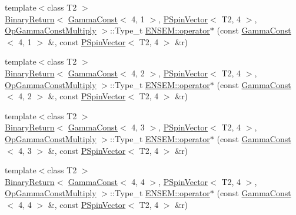 \begin{DoxyCompactItemize}
\item 
{\footnotesize template$<$class T2 $>$ }\\\mbox{\hyperlink{structENSEM_1_1BinaryReturn}{Binary\+Return}}$<$ \mbox{\hyperlink{classENSEM_1_1GammaConst}{Gamma\+Const}}$<$ 4, 1 $>$, \mbox{\hyperlink{classENSEM_1_1PSpinVector}{P\+Spin\+Vector}}$<$ T2, 4 $>$, \mbox{\hyperlink{structENSEM_1_1OpGammaConstMultiply}{Op\+Gamma\+Const\+Multiply}} $>$\+::Type\+\_\+t \mbox{\hyperlink{group__primspinvector_ga78fc0ed12245c6b5e7ab51e07bd4c553}{E\+N\+S\+E\+M\+::operator$\ast$}} (const \mbox{\hyperlink{classENSEM_1_1GammaConst}{Gamma\+Const}}$<$ 4, 1 $>$ \&, const \mbox{\hyperlink{classENSEM_1_1PSpinVector}{P\+Spin\+Vector}}$<$ T2, 4 $>$ \&r)
\item 
{\footnotesize template$<$class T2 $>$ }\\\mbox{\hyperlink{structENSEM_1_1BinaryReturn}{Binary\+Return}}$<$ \mbox{\hyperlink{classENSEM_1_1GammaConst}{Gamma\+Const}}$<$ 4, 2 $>$, \mbox{\hyperlink{classENSEM_1_1PSpinVector}{P\+Spin\+Vector}}$<$ T2, 4 $>$, \mbox{\hyperlink{structENSEM_1_1OpGammaConstMultiply}{Op\+Gamma\+Const\+Multiply}} $>$\+::Type\+\_\+t \mbox{\hyperlink{group__primspinvector_ga89998f51b7e59a05842c92f95ca427e4}{E\+N\+S\+E\+M\+::operator$\ast$}} (const \mbox{\hyperlink{classENSEM_1_1GammaConst}{Gamma\+Const}}$<$ 4, 2 $>$ \&, const \mbox{\hyperlink{classENSEM_1_1PSpinVector}{P\+Spin\+Vector}}$<$ T2, 4 $>$ \&r)
\item 
{\footnotesize template$<$class T2 $>$ }\\\mbox{\hyperlink{structENSEM_1_1BinaryReturn}{Binary\+Return}}$<$ \mbox{\hyperlink{classENSEM_1_1GammaConst}{Gamma\+Const}}$<$ 4, 3 $>$, \mbox{\hyperlink{classENSEM_1_1PSpinVector}{P\+Spin\+Vector}}$<$ T2, 4 $>$, \mbox{\hyperlink{structENSEM_1_1OpGammaConstMultiply}{Op\+Gamma\+Const\+Multiply}} $>$\+::Type\+\_\+t \mbox{\hyperlink{group__primspinvector_gade157607bce53ec9ffcde3e07f772efb}{E\+N\+S\+E\+M\+::operator$\ast$}} (const \mbox{\hyperlink{classENSEM_1_1GammaConst}{Gamma\+Const}}$<$ 4, 3 $>$ \&, const \mbox{\hyperlink{classENSEM_1_1PSpinVector}{P\+Spin\+Vector}}$<$ T2, 4 $>$ \&r)
\item 
{\footnotesize template$<$class T2 $>$ }\\\mbox{\hyperlink{structENSEM_1_1BinaryReturn}{Binary\+Return}}$<$ \mbox{\hyperlink{classENSEM_1_1GammaConst}{Gamma\+Const}}$<$ 4, 4 $>$, \mbox{\hyperlink{classENSEM_1_1PSpinVector}{P\+Spin\+Vector}}$<$ T2, 4 $>$, \mbox{\hyperlink{structENSEM_1_1OpGammaConstMultiply}{Op\+Gamma\+Const\+Multiply}} $>$\+::Type\+\_\+t \mbox{\hyperlink{group__primspinvector_gaa8429bcfc1a7a130ec526f34f8b08c20}{E\+N\+S\+E\+M\+::operator$\ast$}} (const \mbox{\hyperlink{classENSEM_1_1GammaConst}{Gamma\+Const}}$<$ 4, 4 $>$ \&, const \mbox{\hyperlink{classENSEM_1_1PSpinVector}{P\+Spin\+Vector}}$<$ T2, 4 $>$ \&r)

\end{DoxyCompactItemize}
